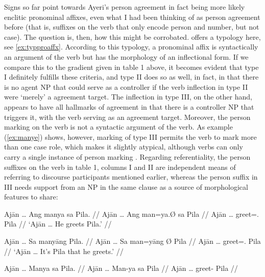 Signs so far point towards Ayeri's person agreement in fact being more 
likely enclitic pronominal affixes, even what I had been thinking of as 
person agreement before (that is, suffixes on the verb that only encode person 
and number, but not case). The question is, then, how this might be corrobated. 
\citeauthor{corbett2006} offers a typology here, see \autoref{ex:typproaffx}. 
According to this typology, a pronominal affix is syntactically an argument of 
the verb but has the morphology of an inflectional form. If we compare this to 
the gradient given in table 1 above, it becomes evident that type I definitely 
fulfills these criteria, and type II does so as well, in fact, in that there is 
no agent NP that could serve as a controller if the verb inflection in type II 
were `merely' a agreement target. The inflection in type III, on the other 
hand, appears to have all hallmarks of agreement in that there is a controller 
NP that triggers it, with the verb serving as an agreement target. Moreover, 
the person marking on the verb is not a syntactic argument of the verb. As 
example (\ref{ex:manye}) shows, however, marking of type III permits the verb 
to mark more than one case role, which makes it slightly atypical, although 
verbs can only carry a single instance of person marking 
\citep[103]{corbett2006}. Regarding referentiality, the person suffixes on the 
verb in table 1, columns I and II are independent means of referring to 
discourse participants mentioned earlier, whereas the person suffix in III 
needs support from an NP in the same clause as a source of morphological 
features to share:

\pex %
\a\label{ex:agttopclit}\begingl
	\gla Ajān … Ang manya sa Pila. //
	\glb Ajān … Ang man=ya.Ø sa ​Pila //
	\glc Ajān … \AgtT{} greet=\TsgM{}.\Top{} \Parg{} ​Pila //
	\glft `Ajān … He greets Pila.' //
\endgl

\a\label{ex:agtproclit}\begingl
	\gla Ajān … Sa manyāng {} Pila. //
	\glb Ajān … Sa man=yāng Ø ​Pila //
	\glc Ajān … \PatT{} greet=\TsgM{}.\Aarg{} \Top{} ​Pila //
	\glft `Ajān … It's Pila that he greets.' //
\endgl

\a\label{ex:wrongagr}\ljudge* \begingl
	\gla Ajān … Manya sa Pila. //
	\glb Ajān … Man-ya sa ​Pila //
	\glc Ajān … greet-\TsgM{} \Parg{} ​Pila //
\endgl

\xe


